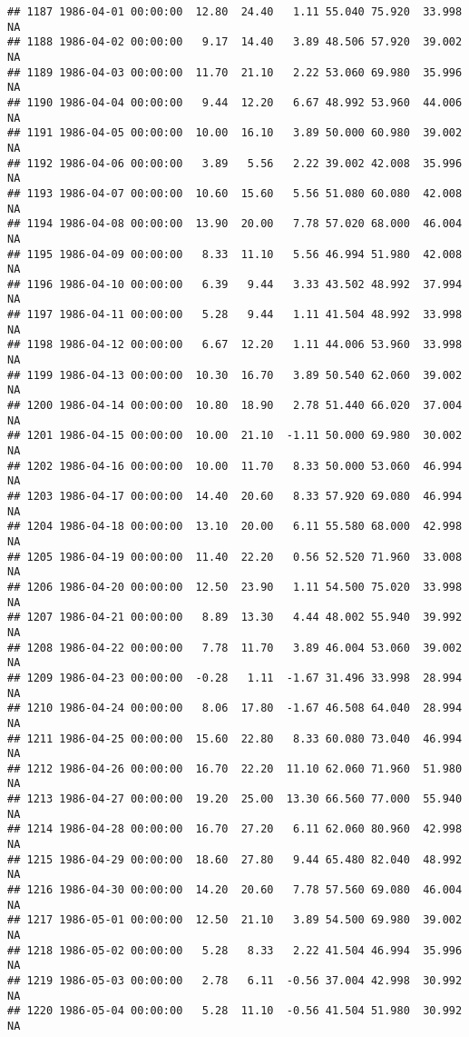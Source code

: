 \documentclass{article}\usepackage{graphicx, color}
\makeatletter
\newenvironment{kframe}{%
 \def\at@end@of@kframe{}%
 \ifinner\ifhmode%
  \def\at@end@of@kframe{\end{minipage}}%
  \begin{minipage}{\columnwidth}%
 \fi\fi%
 \def\FrameCommand##1{\hskip\@totalleftmargin \hskip-\fboxsep
 \colorbox{shadecolor}{##1}\hskip-\fboxsep
     \hskip-\linewidth \hskip-\@totalleftmargin \hskip\columnwidth}%
 \MakeFramed {\advance\hsize-\width
   \@totalleftmargin\z@ \linewidth\hsize
   \@setminipage}}%
 {\par\unskip\endMakeFramed%
 \at@end@of@kframe}
\newenvironment{knitrout}{}{} %
\makeatother
\begin{document}
\begin{knitrout}
\begin{kframe}
\begin{verbatim}
## 1187 1986-04-01 00:00:00  12.80  24.40   1.11 55.040 75.920  33.998     NA
## 1188 1986-04-02 00:00:00   9.17  14.40   3.89 48.506 57.920  39.002     NA
## 1189 1986-04-03 00:00:00  11.70  21.10   2.22 53.060 69.980  35.996     NA
## 1190 1986-04-04 00:00:00   9.44  12.20   6.67 48.992 53.960  44.006     NA
## 1191 1986-04-05 00:00:00  10.00  16.10   3.89 50.000 60.980  39.002     NA
## 1192 1986-04-06 00:00:00   3.89   5.56   2.22 39.002 42.008  35.996     NA
## 1193 1986-04-07 00:00:00  10.60  15.60   5.56 51.080 60.080  42.008     NA
## 1194 1986-04-08 00:00:00  13.90  20.00   7.78 57.020 68.000  46.004     NA
## 1195 1986-04-09 00:00:00   8.33  11.10   5.56 46.994 51.980  42.008     NA
## 1196 1986-04-10 00:00:00   6.39   9.44   3.33 43.502 48.992  37.994     NA
## 1197 1986-04-11 00:00:00   5.28   9.44   1.11 41.504 48.992  33.998     NA
## 1198 1986-04-12 00:00:00   6.67  12.20   1.11 44.006 53.960  33.998     NA
## 1199 1986-04-13 00:00:00  10.30  16.70   3.89 50.540 62.060  39.002     NA
## 1200 1986-04-14 00:00:00  10.80  18.90   2.78 51.440 66.020  37.004     NA
## 1201 1986-04-15 00:00:00  10.00  21.10  -1.11 50.000 69.980  30.002     NA
## 1202 1986-04-16 00:00:00  10.00  11.70   8.33 50.000 53.060  46.994     NA
## 1203 1986-04-17 00:00:00  14.40  20.60   8.33 57.920 69.080  46.994     NA
## 1204 1986-04-18 00:00:00  13.10  20.00   6.11 55.580 68.000  42.998     NA
## 1205 1986-04-19 00:00:00  11.40  22.20   0.56 52.520 71.960  33.008     NA
## 1206 1986-04-20 00:00:00  12.50  23.90   1.11 54.500 75.020  33.998     NA
## 1207 1986-04-21 00:00:00   8.89  13.30   4.44 48.002 55.940  39.992     NA
## 1208 1986-04-22 00:00:00   7.78  11.70   3.89 46.004 53.060  39.002     NA
## 1209 1986-04-23 00:00:00  -0.28   1.11  -1.67 31.496 33.998  28.994     NA
## 1210 1986-04-24 00:00:00   8.06  17.80  -1.67 46.508 64.040  28.994     NA
## 1211 1986-04-25 00:00:00  15.60  22.80   8.33 60.080 73.040  46.994     NA
## 1212 1986-04-26 00:00:00  16.70  22.20  11.10 62.060 71.960  51.980     NA
## 1213 1986-04-27 00:00:00  19.20  25.00  13.30 66.560 77.000  55.940     NA
## 1214 1986-04-28 00:00:00  16.70  27.20   6.11 62.060 80.960  42.998     NA
## 1215 1986-04-29 00:00:00  18.60  27.80   9.44 65.480 82.040  48.992     NA
## 1216 1986-04-30 00:00:00  14.20  20.60   7.78 57.560 69.080  46.004     NA
## 1217 1986-05-01 00:00:00  12.50  21.10   3.89 54.500 69.980  39.002     NA
## 1218 1986-05-02 00:00:00   5.28   8.33   2.22 41.504 46.994  35.996     NA
## 1219 1986-05-03 00:00:00   2.78   6.11  -0.56 37.004 42.998  30.992     NA
## 1220 1986-05-04 00:00:00   5.28  11.10  -0.56 41.504 51.980  30.992     NA

\end{verbatim}
\end{kframe}
\end{knitrout}
\end{document}
